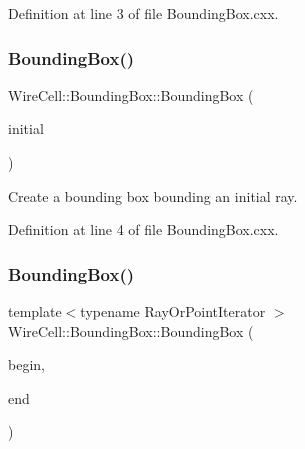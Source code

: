 Definition at line 3 of file Bounding\+Box.\+cxx.

\mbox{\label{class_wire_cell_1_1_bounding_box_a243f42132a2da67f25125b60491d87ad}} 
\subsubsection{\texorpdfstring{Bounding\+Box()}{BoundingBox()}\hspace{0.1cm}{\footnotesize\ttfamily [3/4]}}
{\footnotesize\ttfamily Wire\+Cell\+::\+Bounding\+Box\+::\+Bounding\+Box (\begin{DoxyParamCaption}\item[{const \hyperlink{namespace_wire_cell_a3ab20d9b438feb7eb1ffaab9ba98af0c}{Ray} \&}]{initial }\end{DoxyParamCaption})}



Create a bounding box bounding an initial ray. 



Definition at line 4 of file Bounding\+Box.\+cxx.

\mbox{\label{class_wire_cell_1_1_bounding_box_ac84d096b79ddd8ea2b4d73c1d324c739}} 
\subsubsection{\texorpdfstring{Bounding\+Box()}{BoundingBox()}\hspace{0.1cm}{\footnotesize\ttfamily [4/4]}}
{\footnotesize\ttfamily template$<$typename Ray\+Or\+Point\+Iterator $>$ \\
Wire\+Cell\+::\+Bounding\+Box\+::\+Bounding\+Box (\begin{DoxyParamCaption}\item[{const Ray\+Or\+Point\+Iterator \&}]{begin,  }\item[{const Ray\+Or\+Point\+Iterator \&}]{end }\end{DoxyParamCaption})\hspace{0.3cm}{\ttfamily [inline]}}



